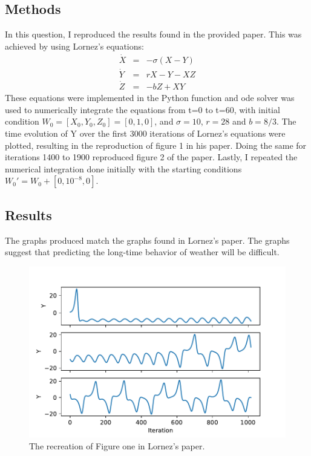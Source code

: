 \documentclass{article}
\begin{document}
\subsection*{Methods}
In this question, I reproduced the results found in the provided paper. This was achieved by using Lornez's equations: 
\begin{eqnarray}
\dot X &=& -\sigma(X-Y)\\ \nonumber
\dot Y &=& rX -Y - XZ\\ \nonumber
\dot Z &=& -bZ + XY \nonumber
\end{eqnarray}
These equations were implemented in the Python function and ode solver was used to numerically integrate the equations from t=0 to t=60, with initial condition $W_0 = [X_0, Y_0, Z_0] = [0, 1, 0]$, and $\sigma = 10$, $r = 28$ and $b = 8/3$. The time evolution of Y over the first 3000 iterations of Lornez's equations were plotted, resulting in the reproduction of figure 1 in his paper. Doing the same for iterations 1400 to 1900 reproduced figure 2 of the paper. Lastly, I repeated the numerical integration done initially with the starting conditions $W_0' = W_0 + [0, 10^{-8}, 0]$.

\subsection*{Results}
The graphs produced match the graphs found in Lornez's paper. The graphs suggest that predicting the long-time behavior of weather will be difficult.
\begin{figure}
    \includegraphics[scale=0.6]{Figure1.pdf}
    \caption{The recreation of Figure one in Lornez's paper.}
    \label{fig: Figure 1}
\end{figure}
\end{document}
